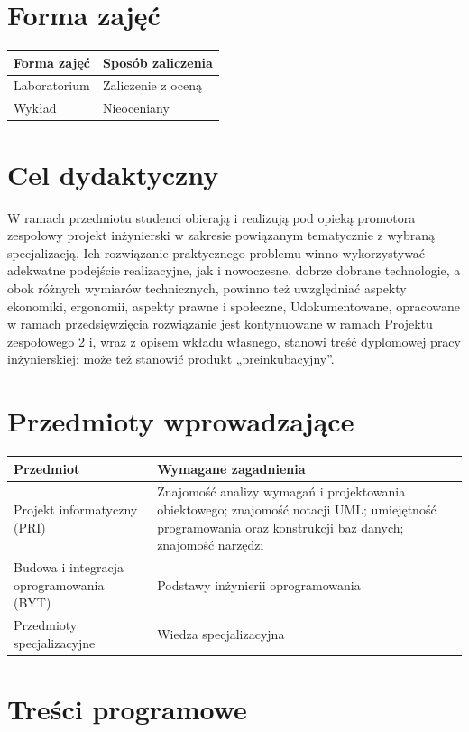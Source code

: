 \documentclass[12pt, a4paper]{article}
\begin{document}
\section{Forma zajęć}

\begin{tabular}{ll}
  \hline
  \textbf{Forma zajęć} & \textbf{Sposób zaliczenia} \\
  \hline
  Laboratorium & Zaliczenie z oceną \\
  Wykład & Nieoceniany \\
  \hline
\end{tabular}

\section{Cel dydaktyczny}

W ramach przedmiotu studenci obierają i realizują pod opieką promotora zespołowy projekt inżynierski w zakresie powiązanym tematycznie z wybraną specjalizacją. Ich rozwiązanie praktycznego problemu winno wykorzystywać adekwatne podejście realizacyjne, jak i nowoczesne, dobrze dobrane technologie, a obok różnych wymiarów technicznych, powinno też uwzględniać aspekty ekonomiki, ergonomii, aspekty prawne i społeczne, Udokumentowane, opracowane w ramach przedsięwzięcia rozwiązanie jest kontynuowane w ramach Projektu zespołowego 2 i, wraz z opisem wkładu własnego, stanowi treść dyplomowej pracy inżynierskiej; może też stanowić produkt „preinkubacyjny”.

\section{Przedmioty wprowadzające}

\begin{tabularx}{\textwidth}{lX}
  \hline
  \textbf{Przedmiot} & \textbf{Wymagane zagadnienia} \\
  \hline
  Projekt informatyczny (PRI) & Znajomość analizy wymagań i projektowania obiektowego; znajomość notacji UML; umiejętność programowania oraz konstrukcji baz danych; znajomość narzędzi \\
  Budowa i integracja oprogramowania (BYT) & Podstawy inżynierii oprogramowania \\
  Przedmioty specjalizacyjne & Wiedza specjalizacyjna \\
  \hline
\end{tabularx}

\section{Treści programowe}
\end{document}
